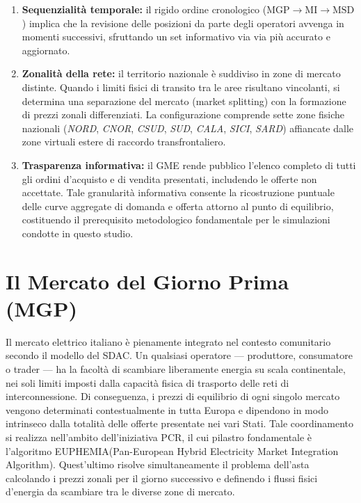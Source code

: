 \begin{enumerate}
    \item \textbf{Sequenzialità temporale:} il rigido ordine cronologico ($\text{MGP} \to \text{MI} \to \text{MSD}$) implica che la revisione delle posizioni da parte degli operatori avvenga in momenti successivi, sfruttando un set informativo via via più accurato e aggiornato.
    \item \textbf{Zonalità della rete:} il territorio nazionale è suddiviso in zone di mercato distinte. Quando i limiti fisici di transito tra le aree risultano vincolanti, si determina una separazione del mercato (market splitting) con la formazione di prezzi zonali differenziati. La configurazione comprende sette zone fisiche nazionali (\textit{NORD}, \textit{CNOR}, \textit{CSUD}, \textit{SUD}, \textit{CALA}, \textit{SICI}, \textit{SARD}) affiancate dalle zone virtuali estere di raccordo transfrontaliero.
    \item \textbf{Trasparenza informativa:} il \ac{GME} rende pubblico l'elenco completo di tutti gli ordini d'acquisto e di vendita presentati, includendo le offerte non accettate. Tale granularità informativa consente la ricostruzione puntuale delle curve aggregate di domanda e offerta attorno al punto di equilibrio, costituendo il prerequisito metodologico fondamentale per le simulazioni condotte in questo studio.
\end{enumerate}


\section{Il Mercato del Giorno Prima (MGP)}

Il mercato elettrico italiano è pienamente integrato nel contesto comunitario secondo il modello del \acf{SDAC}. Un qualsiasi operatore — produttore, consumatore o trader — ha la facoltà di scambiare liberamente energia su scala continentale, nei soli limiti imposti dalla capacità fisica di trasporto delle reti di interconnessione. Di conseguenza, i prezzi di equilibrio di ogni singolo mercato vengono determinati contestualmente in tutta Europa e dipendono in modo intrinseco dalla totalità delle offerte presentate nei vari Stati. Tale coordinamento si realizza nell'ambito dell'iniziativa \acf{PCR}, il cui pilastro fondamentale è l'algoritmo \textsf{E{\small UPHEMIA}}(Pan-European Hybrid Electricity Market Integration Algorithm). Quest'ultimo risolve simultaneamente il problema dell'asta calcolando i prezzi zonali per il giorno successivo e definendo i flussi fisici d'energia da scambiare tra le diverse zone di mercato.


